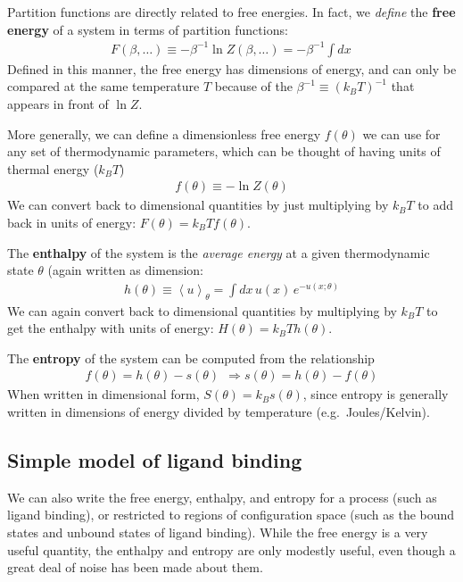 \documentclass[english,course]{lecture}
\begin{document}
Partition functions are directly related to free energies.
In fact, we \emph{define} the {\bf free energy} of a system in terms of partition functions:
\begin{eqnarray}
F(\beta, \ldots) \equiv - \beta^{-1} \ln Z(\beta, \ldots) = - \beta^{-1} \int dx \, 
\end{eqnarray}
Defined in this manner, the free energy has dimensions of energy, and can only be compared at the same temperature $T$ because of the $\beta^{-1} \equiv (k_B T)^{-1}$ that appears in front of $\ln Z$.

More generally, we can define a dimensionless free energy $f(\theta)$ we can use for any set of thermodynamic parameters, which can be thought of having units of thermal energy ($k_B T$)
\begin{eqnarray}
f(\theta) \equiv - \ln Z(\theta)
\end{eqnarray}
We can convert back to dimensional quantities by just multiplying by $k_B T$ to add back in units of energy: $F(\theta) = k_B T f(\theta)$.

The {\bf enthalpy} of the system is the \emph{average energy} at a given thermodynamic state $\theta$ (again written as dimension:
\begin{eqnarray}
h(\theta) \equiv \left< u \right>_\theta = \int dx \, u(x) \, e^{-u(x; \theta)}
\end{eqnarray}
We can again convert back to dimensional quantities by multiplying by $k_B T$ to get the enthalpy with units of energy: $H(\theta) = k_B T h(\theta)$.

The {\bf entropy} of the system can be computed from the relationship
\begin{eqnarray}
f(\theta) = h(\theta) - s(\theta) \:\: \Rightarrow s(\theta) = h(\theta) - f(\theta)
\end{eqnarray}
When written in dimensional form, $S(\theta) = k_B s(\theta)$, since entropy is generally written in dimensions of energy divided by temperature (e.g.\ Joules/Kelvin).

\subsection{Simple model of ligand binding}

We can also write the free energy, enthalpy, and entropy for a process (such as ligand binding), or restricted to regions of configuration space (such as the bound states and unbound states of ligand binding). 
While the free energy is a very useful quantity, the enthalpy and entropy are only modestly useful, even though a great deal of noise has been made about them.
\end{document}
